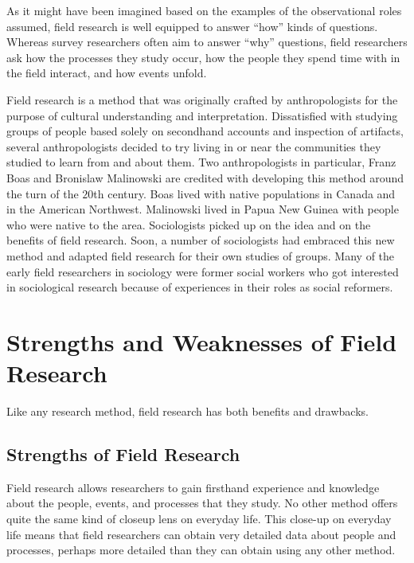 As it might have been imagined based on the examples of the observational roles assumed, field research is well equipped to answer ``how'' kinds of questions. Whereas survey researchers often aim to answer ``why'' questions, field researchers ask how the processes they study occur, how the people they spend time with in the field interact, and how events unfold. 

Field research is a method that was originally crafted by anthropologists for the purpose of cultural understanding and interpretation\cite{wolcott1999ethnography}. Dissatisfied with studying groups of people based solely on secondhand accounts and inspection of artifacts, several anthropologists decided to try living in or near the communities they studied to learn from and about them. Two anthropologists in particular, Franz Boas\cite{boas1964central} and Bronislaw Malinowski\cite{malinowski2014argonauts} are credited with developing this method around the turn of the $ 20 $th century. Boas lived with native populations in Canada and in the American Northwest. Malinowski lived in Papua New Guinea with people who were native to the area. Sociologists picked up on the idea and on the benefits of field research. Soon, a number of sociologists had embraced this new method and adapted field research for their own studies of groups. Many of the early field researchers in sociology were former social workers who got interested in sociological research because of experiences in their roles as social reformers. 

\section{Strengths and Weaknesses of Field Research}

Like any research method, field research has both benefits and drawbacks.

\subsection{Strengths of Field Research}

Field research allows researchers to gain firsthand experience and knowledge about the people, events, and processes that they study. No other method offers quite the same kind of closeup lens on everyday life. This close-up on everyday life means that field researchers can obtain very detailed data about people and processes, perhaps more detailed than they can obtain using any other method.

